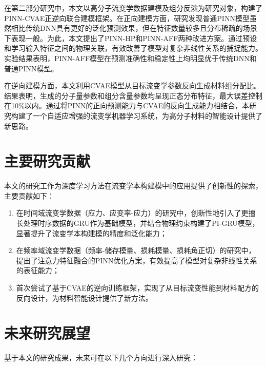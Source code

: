 在第二部分研究中，本文以高分子流变学数据建模及组分反演为研究对象，构建了PINN-CVAE正逆向联合建模框架。在正向建模方面，研究发现普通PINN模型虽然相比传统DNN具有更好的泛化预测效果，但在特征数量较多且分布稀疏的场景下表现一般。为此，本文提出了PINN-HP和PINN-AFF两种改进方案。通过预设和学习输入特征之间的物理关联，有效改善了模型对复杂非线性关系的捕捉能力。实验结果表明，PINN-AFF模型在预测准确性和稳定性上均明显优于传统DNN和普通PINN模型。

在逆向建模方面，本文利用CVAE模型从目标流变学参数反向生成材料组分配比。结果表明，生成的分子量参数和组分含量参数均呈现正态分布特征，最大误差控制在10\%以内。通过将PINN的正向预测能力与CVAE的反向生成能力相结合，本研究构建了一个自适应增强的流变学机器学习系统，为高分子材料的智能设计提供了新思路。

\section*{主要研究贡献}
本文的研究工作为深度学习方法在流变学本构建模中的应用提供了创新性的探索，主要贡献如下：

\begin{enumerate}[topsep = 0 pt, itemsep= 0 pt, parsep=0pt, partopsep=0pt, leftmargin=44pt, itemindent=0pt, labelsep=6pt, label=(\arabic*)]
  \item 在时间域流变学数据（应力、应变率-应力）的研究中，创新性地引入了更擅长处理时序数据的GRU作为基础模型，并结合物理约束构建了PI-GRU模型，显著提升了流变学本构建模的精度和泛化能力；
  \item 在频率域流变学数据（频率-储存模量、损耗模量、损耗角正切）的研究中，提出了注意力特征融合的PINN优化方案，有效提高了模型对复杂非线性关系的表征能力；
  \item 首次尝试了基于CVAE的逆向训练框架，实现了从目标流变性能到材料配方的反向设计，为材料智能设计提供了新方法。
\end{enumerate}

\section*{未来研究展望}
基于本文的研究成果，未来可在以下几个方向进行深入研究：

